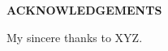 \begin{center}
\large{\textbf{ACKNOWLEDGEMENTS}}\\
\vspace{1cm}
\end{center}
My sincere thanks to XYZ.

